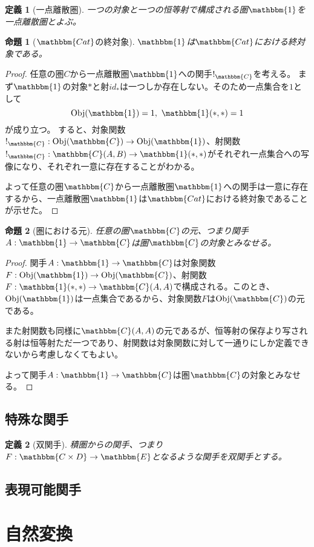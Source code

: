 \documentclass[dvipdfmx]{jsarticle}
\newcommand{\cat}[1]{\mathbbm{#1}}
\newcommand{\arrow}{\rightarrow}
\newcommand{\functor}[3]{#1:\cat{#2}\arrow \cat{#3}}
\newcommand{\obj}[1]{\mathrm{Obj}(\cat{#1})}
\newcommand{\mor}[3]{#1:#2\arrow #3}
\newcommand{\arset}[3]{\cat{#1}(#2,#3)}
\newtheorem{proof}{証明}[section]
\newtheorem{prop}{命題}[section]
\newtheorem{define}{定義}[section]
\numberwithin{proof}{subsection}
\numberwithin{prop}{subsection}
\numberwithin{define}{subsection}
\begin{document}
	\begin{define}[一点離散圏]
	一つの対象と一つの恒等射で構成される圏$\cat{1}$を一点離散圏とよぶ。
	\end{define}
	\begin{prop}[$\cat{Cat}$の終対象]
		$\cat{1}$は$\cat{Cat}$における終対象である。
	\end{prop}
	\begin{proof}
		任意の圏$C$から一点離散圏$\cat{1}$への関手$!_{\cat{C}}$を考える。
		まず$\cat{1}$の対象$*$と射$id_*$は一つしか存在しない。そのため一点集合を$1$として
		\[\obj{1}=1,\ \arset{1}{*}{*}=1\]が成り立つ。
		すると、対象関数$\mor{!_{\cat{C}}}{\obj{C}}{\obj{1}}$、射関数$\mor{!_{\cat{C}}}{\arset{C}{A}{B}}{\arset{1}{*}{*}}$がそれぞれ一点集合への写像になり、それぞれ一意に存在することがわかる。

		よって任意の圏$\cat{C}$から一点離散圏$\cat{1}$への関手は一意に存在するから、一点離散圏$\cat{1}$は$\cat{Cat}$における終対象であることが示せた。
	\end{proof}
	\begin{prop}[圏における元]
		任意の圏$\cat{C}$の元、つまり関手$\functor{A}{1}{C}$は圏$\cat{C}$の対象とみなせる。
	\end{prop}
	\begin{proof}
		関手$\functor{A}{1}{C}$は対象関数$\mor{F}{\obj{1}}{\obj{C}}$、射関数$\mor{F}{\arset{1}{*}{*}}{\arset{C}{A}{A}}$で構成される。このとき、$\obj{1}$は一点集合であるから、対象関数$F$は$\obj{C}$の元である。

		また射関数も同様に$\arset{C}{A}{A}$の元であるが、恒等射の保存より写される射は恒等射ただ一つであり、射関数は対象関数に対して一通りにしか定義できないから考慮しなくてもよい。

		よって関手$\functor{A}{1}{C}$は圏$\cat{C}$の対象とみなせる。
	\end{proof}
	\subsection{特殊な関手}
	\begin{define}[双関手]
		積圏からの関手、つまり$\functor{F}{C\times D}{E}$となるような関手を双関手とする。
	\end{define}
	\subsection{表現可能関手}
	\section{自然変換}
\end{document}
